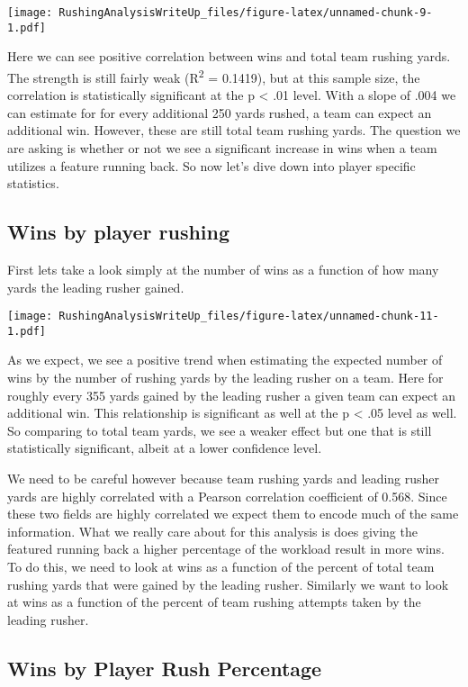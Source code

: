 \documentclass[]{article}
\begin{document}
\texttt{[image: RushingAnalysisWriteUp\_files/figure-latex/unnamed-chunk-9-1.pdf]}

Here we can see positive correlation between wins and total team rushing
yards. The strength is still fairly weak (R\textsuperscript{2} =
0.1419), but at this sample size, the correlation is statistically
significant at the p \textless{} .01 level. With a slope of .004 we can
estimate for for every additional 250 yards rushed, a team can expect an
additional win. However, these are still total team rushing yards. The
question we are asking is whether or not we see a significant increase
in wins when a team utilizes a feature running back. So now let's dive
down into player specific statistics.

\hypertarget{wins-by-player-rushing}{%
\subsection{Wins by player rushing}\label{wins-by-player-rushing}}

First lets take a look simply at the number of wins as a function of how
many yards the leading rusher gained.

\texttt{[image: RushingAnalysisWriteUp\_files/figure-latex/unnamed-chunk-11-1.pdf]}

As we expect, we see a positive trend when estimating the expected
number of wins by the number of rushing yards by the leading rusher on a
team. Here for roughly every 355 yards gained by the leading rusher a
given team can expect an additional win. This relationship is
significant as well at the p \textless{} .05 level as well. So comparing
to total team yards, we see a weaker effect but one that is still
statistically significant, albeit at a lower confidence level.

We need to be careful however because team rushing yards and leading
rusher yards are highly correlated with a Pearson correlation
coefficient of 0.568. Since these two fields are highly correlated we
expect them to encode much of the same information. What we really care
about for this analysis is does giving the featured running back a
higher percentage of the workload result in more wins. To do this, we
need to look at wins as a function of the percent of total team rushing
yards that were gained by the leading rusher. Similarly we want to look
at wins as a function of the percent of team rushing attempts taken by
the leading rusher.

\hypertarget{wins-by-player-rush-percentage}{%
\subsection{Wins by Player Rush
Percentage}\label{wins-by-player-rush-percentage}}
\end{document}
